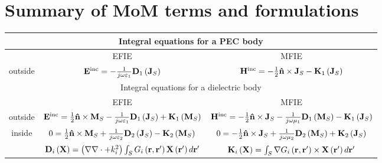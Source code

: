 \chapter{Summary of MoM terms and formulations}
%
\par
\renewcommand{\arraystretch}{2}
\begin{table}[h!]
\centering
\begin{tabular}{|c||c|c|}
  \hline
  \multicolumn{3}{|c|}{Integral equations for a PEC body} \\
  \hline
  \hline
   & EFIE & MFIE \\
  \hline
  outside & $\mathbf{E}^\text{inc} =  - \frac{1}{j \omega \varepsilon_1} \mathbf{D}_1 \left( \mathbf{J}_{S}\right)$ & $\mathbf{H}^\text{inc} = - \frac{1}{2} \mathbf{\hat{n}} \times \mathbf{J}_{S} - \mathbf{K}_1 \left(\mathbf{J}_{S}\right)$ \\
  \hline
  \hline
  \multicolumn{3}{|c|}{Integral equations for a dielectric body} \\
  \hline
  \hline
   & EFIE & MFIE \\
  \hline
  outside & $\mathbf{E}^\text{inc} =  \frac{1}{2} \mathbf{\hat{n}} \times \mathbf{M}_{S} - \frac{1}{j \omega \varepsilon_1} \mathbf{D}_1 \left( \mathbf{J}_{S}\right) + \mathbf{K}_1 \left(\mathbf{M}_{S}\right)$ & $\mathbf{H}^\text{inc} = - \frac{1}{2} \mathbf{\hat{n}} \times \mathbf{J}_{S} - \frac{1}{j \omega \mu_1} \mathbf{D}_1 \left( \mathbf{M}_{S}\right) - \mathbf{K}_1 \left(\mathbf{J}_{S}\right)$ \\
  \hline
  inside  & $0 = \frac{1}{2} \mathbf{\hat{n}} \times \mathbf{M}_{S} + \frac{1}{j \omega \varepsilon_2} \mathbf{D}_2\left(\mathbf{J}_{S}\right) -  \mathbf{K}_2\left( \mathbf{M}_{S}\right)$ & $0 = - \frac{1}{2} \mathbf{\hat{n}} \times \mathbf{J}_{S} + \frac{1}{j \omega \mu_2} \mathbf{D}_2\left(\mathbf{M}_{S}\right) +  \mathbf{K}_2\left( \mathbf{J}_{S}\right)$ \\
  \hline
  \hline
 & $\mathbf{D}_i\left(\mathbf{X}\right) = \left(\nabla \nabla \cdot + k_i^2\right) \int_{S} G_i\left(\mathbf{r}, \mathbf{r}'\right) \mathbf{X}\left(\mathbf{r}'\right) d\mathbf{r}'$  & $\mathbf{K}_i\left(\mathbf{X}\right) = \int_S \nabla G_i\left(\mathbf{r}, \mathbf{r}'\right) \times \mathbf{X}\left(\mathbf{r}'\right) d\mathbf{r}'$ \\
  \hline
\end{tabular}
\end{table}

